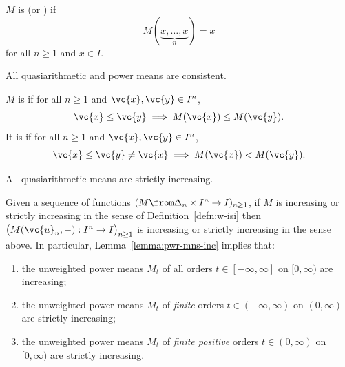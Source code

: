 \begin{defn}
$M$ is %
%
% 
(or ) if
\[
M(\underbrace{x, \ldots, x}_n) = x
\]
for all $n \geq 1$ and $x \in I$.
\end{defn}

\begin{example}
All quasiarithmetic and power means are consistent.
\end{example}

\begin{defn}
$M$ is %
% 
%
% 
if for all $n \geq 1$ and $\vc{x}, \vc{y} \in I^n$, 
\[
\vc{x} \leq \vc{y} \implies M(\vc{x}) \leq M(\vc{y}).
\]
It is %
% 
%
%
% 
if for all $n \geq 1$ and $\vc{x}, \vc{y} \in I^n$,
\[
\vc{x} \leq \vc{y} \neq \vc{x} \implies M(\vc{x}) < M(\vc{y}).
\]
\end{defn}

\begin{example}
All quasiarithmetic means are strictly increasing.
\end{example}

\begin{examples}
Given a sequence of functions $(M \from \Delta_n \times I^n \to I)_{n \geq
  1}$, if $M$ is increasing or strictly increasing in the sense of
Definition~\ref{defn:w-isi} then $\bigl( M(\vc{u}_n, -): I^n \to I\bigr)_{n
  \geq 1}$ is increasing or strictly increasing in the sense above.  In
particular, Lemma~\ref{lemma:pwr-mns-inc} implies that:
% 
\begin{enumerate}
\item 
the unweighted power means $M_t$ of all orders $t \in [-\infty, \infty]$ on $[0,
  \infty)$ are increasing;

\item
{}
the unweighted power means $M_t$ of \emph{finite} orders $t \in (-\infty,
\infty)$ on $(0, \infty)$ are strictly increasing;

\item
the unweighted power means $M_t$ of \emph{finite positive} orders $t \in
(0, \infty)$ on $[0, \infty)$ are strictly increasing.
\end{enumerate}
\end{examples}

